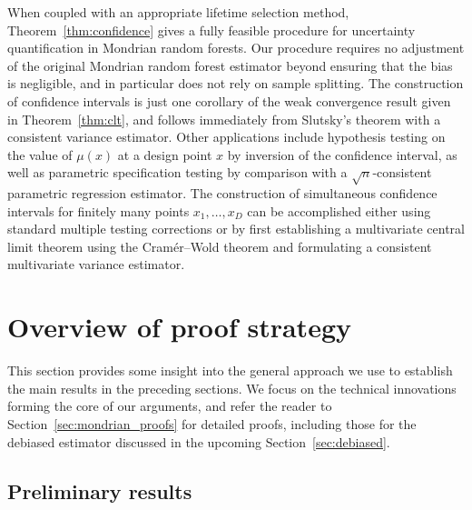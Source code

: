 When coupled with an appropriate lifetime selection method,
Theorem~\ref{thm:confidence} gives a fully feasible procedure
for uncertainty quantification in Mondrian random forests.
Our procedure requires no adjustment of the original Mondrian random
forest estimator beyond ensuring that the bias is negligible,
and in particular does not rely on sample splitting.
The construction of confidence intervals is just one corollary
of the weak convergence result given in Theorem~\ref{thm:clt},
and follows immediately from Slutsky's theorem
with a consistent variance estimator.
Other applications include hypothesis testing on the value
of $\mu(x)$ at a design point $x$ by inversion of the confidence interval,
as well as parametric specification testing by comparison with
a $\sqrt{n}$-consistent parametric regression estimator.
The construction of simultaneous confidence
intervals for finitely many points $x_1, \ldots, x_D$
can be accomplished either using standard multiple testing corrections
or by first establishing a multivariate
central limit theorem using the Cram{\'e}r--Wold theorem
and formulating a consistent multivariate variance estimator.

\section{Overview of proof strategy}%
\label{sec:overview_proofs}

This section provides some insight into
the general approach we use to establish the main results
in the preceding sections. We focus on the technical innovations
forming the core of our arguments, and refer the reader to
Section~\ref{sec:mondrian_proofs} for detailed proofs,
including those for the debiased estimator discussed in the upcoming
Section~\ref{sec:debiased}.

\subsection*{Preliminary results}


